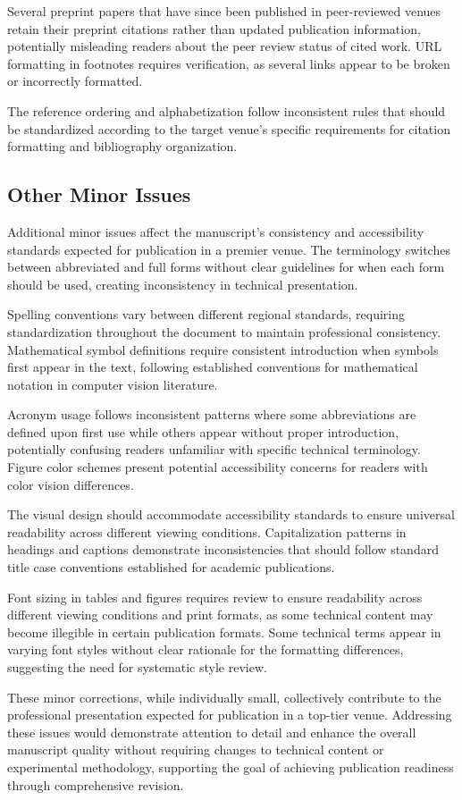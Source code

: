 Several preprint papers that have since been published in peer-reviewed venues retain their preprint citations rather than updated publication information, potentially misleading readers about the peer review status of cited work. URL formatting in footnotes requires verification, as several links appear to be broken or incorrectly formatted.

The reference ordering and alphabetization follow inconsistent rules that should be standardized according to the target venue's specific requirements for citation formatting and bibliography organization.

\subsection*{Other Minor Issues}
Additional minor issues affect the manuscript's consistency and accessibility standards expected for publication in a premier venue. The terminology switches between abbreviated and full forms without clear guidelines for when each form should be used, creating inconsistency in technical presentation.

Spelling conventions vary between different regional standards, requiring standardization throughout the document to maintain professional consistency. Mathematical symbol definitions require consistent introduction when symbols first appear in the text, following established conventions for mathematical notation in computer vision literature.

Acronym usage follows inconsistent patterns where some abbreviations are defined upon first use while others appear without proper introduction, potentially confusing readers unfamiliar with specific technical terminology. Figure color schemes present potential accessibility concerns for readers with color vision differences.

The visual design should accommodate accessibility standards to ensure universal readability across different viewing conditions. Capitalization patterns in headings and captions demonstrate inconsistencies that should follow standard title case conventions established for academic publications.

Font sizing in tables and figures requires review to ensure readability across different viewing conditions and print formats, as some technical content may become illegible in certain publication formats. Some technical terms appear in varying font styles without clear rationale for the formatting differences, suggesting the need for systematic style review.

These minor corrections, while individually small, collectively contribute to the professional presentation expected for publication in a top-tier venue. Addressing these issues would demonstrate attention to detail and enhance the overall manuscript quality without requiring changes to technical content or experimental methodology, supporting the goal of achieving publication readiness through comprehensive revision.

